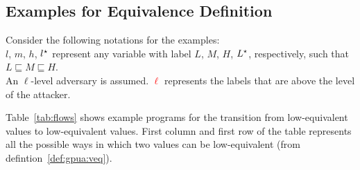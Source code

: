\subsection{Examples for Equivalence Definition}
\label{app:egequi}
Consider the following notations for the examples:\\
$l$, $m$, $h$, $l{}^\star$ represent any variable with label $L$, $M$,
$H$, $L{}^\star$, respectively, such that $L \sqsubseteq M \sqsubseteq H$. \\
An $\ell$-level adversary is assumed. \textcolor{red}{$\ell$}
represents the labels that are above the level of the attacker.

Table~\ref{tab:flows} shows example programs for the transition from
low-equivalent values to low-equivalent values. First column and first
row of the table represents all the possible ways in which two values
can be low-equivalent (from defintion~\ref{def:gpua:veq}).

